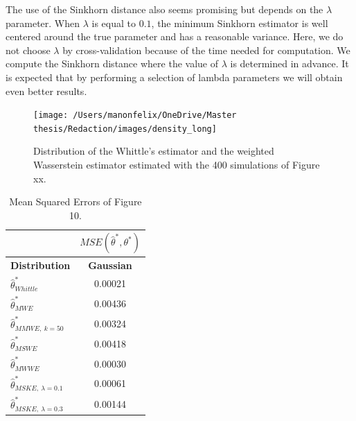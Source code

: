 \documentclass[
  11pt,
]{article}
\begin{document}
The use of the Sinkhorn distance also seems promising but depends on the
\(\lambda\) parameter. When \(\lambda\) is equal to \(0.1\), the minimum
Sinkhorn estimator is well centered around the true parameter and has a
reasonable variance. Here, we do not choose \(\lambda\) by
cross-validation because of the time needed for computation. We compute
the Sinkhorn distance where the value of \(\lambda\) is determined in
advance. It is expected that by performing a selection of lambda
parameters we will obtain even better results.

\begin{figure}

{\centering \texttt{[image: /Users/manonfelix/OneDrive/Master thesis/Redaction/images/density\_long]} 

}

\caption{Distribution of the Whittle's estimator and the weighted Wasserstein estimator estimated with the 400 simulations of Figure xx.}\label{fig:density_long_gauss}
\end{figure}

\begin{table}[h]
\centering
\begin{tabular}{|l|c|}
\hline
                      & $MSE(\hat \theta^*, \theta^*)$                \\ \hline
\textbf{Distribution} & \textbf{Gaussian}                    \\ \hline
$\hat \theta^*_{Whittle}$                   & 0.00021                                \\ \hline
$\hat \theta^*_{MWE}$                      & 0.00436                                \\ \hline
$\hat \theta^*_{MMWE, \ k = 50}$            & 0.00324                               \\ \hline
$\hat \theta^*_{MSWE}$                     & 0.00418                                \\ \hline
$\hat \theta^*_{MWWE}$                       & 0.00030                                \\ \hline
$\hat \theta^*_{MSKE, \ \lambda = 0.1}$      & 0.00061                               \\ \hline
$\hat \theta^*_{MSKE, \ \lambda = 0.3}$      & 0.00144                               \\ \hline
\end{tabular}
\caption{Mean Squared Errors of Figure 10.}
\label{tab:farima_mse_gaussian}
\end{table}
\end{document}
